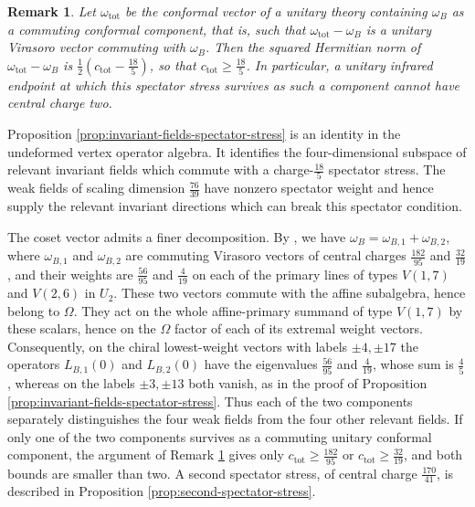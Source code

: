 \documentclass[leqno]{article}
\renewcommand{\geq}{\ensuremath{\geqslant}}
\newtheorem{remark}[thm]{Remark}
\numberwithin{equation}{section}
\begin{document}
\begin{remark}\normalfont
\label{cor:spectator-central-charge-bound}
Let $\omega_{\mathrm{tot}}$ be the conformal vector of a unitary theory containing $\omega_B$ as a commuting conformal component, that is, such that $\omega_{\mathrm{tot}}-\omega_B$ is a unitary Virasoro vector commuting with $\omega_B$. Then the squared Hermitian norm of $\omega_{\mathrm{tot}}-\omega_B$ is $\frac12(c_{\mathrm{tot}}-\frac{18}{5})$, so that $c_{\mathrm{tot}} \geq \frac{18}{5}$. In particular, a unitary infrared endpoint at which this spectator stress survives as such a component cannot have central charge two.
\end{remark}

Proposition \ref{prop:invariant-fields-spectator-stress} is an identity in the undeformed vertex operator algebra. It identifies the four-dimensional subspace of relevant invariant fields which commute with a charge-$\frac{18}{5}$ spectator stress. The weak fields of scaling dimension $\frac{76}{39}$ have nonzero spectator weight and hence supply the relevant invariant directions which can break this spectator condition.

The coset vector admits a finer decomposition. By \cite[Theorem 10.5 p.~30]{Arh26a}, we have $\omega_B = \omega_{B,1}+\omega_{B,2}$, where $\omega_{B,1}$ and $\omega_{B,2}$ are commuting Virasoro vectors of central charges $\frac{182}{95}$ and $\frac{32}{19}$, and their weights are $\frac{56}{95}$ and $\frac{4}{19}$ on each of the primary lines of types $V(1,7)$ and $V(2,6)$ in $U_2$. These two vectors commute with the affine subalgebra, hence belong to $\Omega$. They act on the whole affine-primary summand of type $V(1,7)$ by these scalars, hence on the $\Omega$ factor of each of its extremal weight vectors. Consequently, on the chiral lowest-weight vectors with labels $\pm4,\pm17$ the operators $L_{B,1}(0)$ and $L_{B,2}(0)$ have the eigenvalues $\frac{56}{95}$ and $\frac{4}{19}$, whose sum is $\frac45$, whereas on the labels $\pm3,\pm13$ both vanish, as in the proof of Proposition \ref{prop:invariant-fields-spectator-stress}. Thus each of the two components separately distinguishes the four weak fields from the four other relevant fields. If only one of the two components survives as a commuting unitary conformal component, the argument of Remark \ref{cor:spectator-central-charge-bound} gives only $c_{\mathrm{tot}} \geq \frac{182}{95}$ or $c_{\mathrm{tot}} \geq \frac{32}{19}$, and both bounds are smaller than two. A second spectator stress, of central charge $\frac{170}{41}$, is described in Proposition \ref{prop:second-spectator-stress}.
\end{document}
